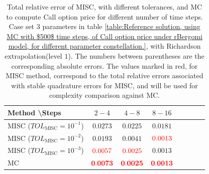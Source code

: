 \begin{table}[h!]
	\centering
	\begin{tabular}{l*{6}{c}r}
		Method \textbackslash  Steps           & $2-4$ & $4-8$ & $8-16$  \\
		\hline
		MISC ($TOL_{\text{MISC}}=10^{-1}$)  &$0.0273$  &$0.0225$ & $0.0181$  \\
			MISC ($TOL_{\text{MISC}}=10^{-2}$)  & $0.0193$  & $0.0041$ & ${\color{red}0.0013}$  \\
		MISC ($TOL_{\text{MISC}}=10^{-3}$)  & ${\color{red}0.0057}$  & ${\color{red}0.0025}$ & $0.0013$  \\
	\hline

		MC    & ${\color{red}\mathbf{0.0073}}$  &   ${\color{red}\mathbf{0.0025}}$  &  ${\color{red}\mathbf{0.0013}}$  \\
		\hline
	\end{tabular}
	\caption{Total relative error of MISC, with different tolerances, and MC to compute Call option price  for different number of time steps. Case set $3$ parameters in table \ref{table:Reference solution, using MC with $500$ time steps, of Call option price under rBergomi model, for different parameter constellation.}, with Richardson extrapolation(level $1$). The numbers between parentheses are the corresponding absolute errors. The values marked in red, for MISC method, correspond to the total relative errors associated with  stable quadrature errors for MISC, and will be used for complexity comparison against MC.}
	\label{Total  error of MISC and MC to compute Call option price of the different tolerances for different number of time steps. Case set $3$ parameters, with Richardson extrapolation(level $1$). The numbers between parentheses are the corresponding absolute errors.}
\end{table}

\FloatBarrier

